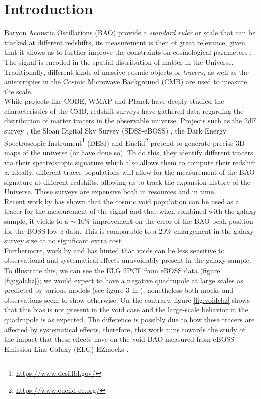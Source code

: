 \documentclass[fleqn, usenatbib]{mnras}
\begin{document}


\section{Introduction}
Baryon Acoustic Oscillations (BAO) provide a \textit{standard ruler} or scale that can be tracked at different redshifts, its measurement is then of great relevance, given that it allows us to further improve the constraints on cosmological parameters \citep{Bassett2010}. The signal is encoded in the spatial distribution of matter in the Universe. Traditionally, different kinds of massive cosmic objects or \textit{tracers}, as well as the anisotropies in the Cosmic Microwave Background (CMB) are used to measure the scale.\\
While projects like COBE, WMAP and Planck have deeply studied the characteristics of the CMB, redshift surveys have gathered data regarding the distribution of matter tracers in the observable universe. Projects such as the 2dF survey \citep{Colless2001}, the Sloan Digital Sky Survey (SDSS-eBOSS) \citep{Dawson2015}, the Dark Energy Spectroscopic Instrument\footnote{\url{https://www.desi.lbl.gov/}} (DESI) and Euclid\footnote{\url{https://www.euclid-ec.org/}} pretend to generate precise 3D maps of the universe (or have done so). To do this, they identify different tracers via their spectroscopic signature which also allows them to compute their redshift $z$. Ideally, different tracer populations will allow for the measurement of the BAO signature at different redshifts, allowing us to track the expansion history of the Universe. These surveys are expensive both in resources and in time.\\
Recent work by \citet{Zhao2019} has shown that the cosmic void population can be used as a tracer for the measurement of the signal and that when combined with the galaxy sample, it yields to a $\sim~10\%$ improvement on the error of the BAO peak position for the BOSS low-$z$ data. This is comparable to a 20\% enlargement in the galaxy survey size at no significant extra cost.\\
Furthermore, work by \citet{Kitaura2016} and \citet{Liang2016} has hinted that voids can be less sensitive to observational and systematical effects unavoidably present in the galaxy sample. To illustrate this, we can see the ELG 2PCF from eBOSS data (figure \ref{fig:galcbz}); we would expect to have a negative quadrupole at large scales as predicted by various models (see figure 3 in \citet{White2015}), nonetheless both mocks and observations seem to show otherwise. On the contrary, figure \ref{fig:voidcbz} shows that this bias is not present in the void case and the large-scale behavior in the quadrupole is as expected. The difference is possibly due to how these tracers are affected by systematical effects, therefore, this work aims towards the study of the impact that these effects have on the void BAO measured from eBOSS Emission Line Galaxy (ELG) EZmocks \citep{Chuang2015a, Zhao2020}.\\
\end{document}
